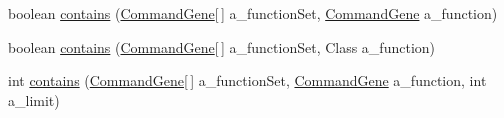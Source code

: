 \begin{DoxyCompactItemize}
\item 
boolean \hyperlink{classorg_1_1jgap_1_1gp_1_1impl_1_1_program_chromosome_a32591e6bcdec0c22383f482ca7c9b39a}{contains} (\hyperlink{classorg_1_1jgap_1_1gp_1_1_command_gene}{Command\-Gene}\mbox{[}$\,$\mbox{]} a\-\_\-function\-Set, \hyperlink{classorg_1_1jgap_1_1gp_1_1_command_gene}{Command\-Gene} a\-\_\-function)
\item 
boolean \hyperlink{classorg_1_1jgap_1_1gp_1_1impl_1_1_program_chromosome_af2a24457cb0fedb950f59a919117cdab}{contains} (\hyperlink{classorg_1_1jgap_1_1gp_1_1_command_gene}{Command\-Gene}\mbox{[}$\,$\mbox{]} a\-\_\-function\-Set, Class a\-\_\-function)
\item 
int \hyperlink{classorg_1_1jgap_1_1gp_1_1impl_1_1_program_chromosome_a6b4c3936426388aeb249ec73ee5131ed}{contains} (\hyperlink{classorg_1_1jgap_1_1gp_1_1_command_gene}{Command\-Gene}\mbox{[}$\,$\mbox{]} a\-\_\-function\-Set, \hyperlink{classorg_1_1jgap_1_1gp_1_1_command_gene}{Command\-Gene} a\-\_\-function, int a\-\_\-limit)
\end{DoxyCompactItemize}
